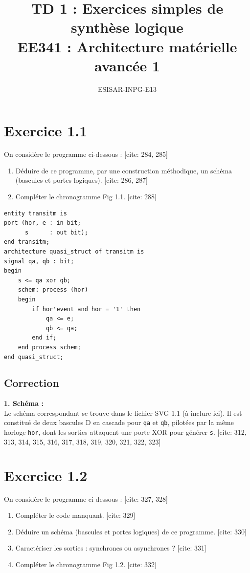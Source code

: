 \documentclass[11pt,a4paper]{article}
\title{TD 1 : Exercices simples de synthèse logique \\ \large EE341 : Architecture matérielle avancée 1}
\author{ESISAR-INPG-E13}
\date{}
\begin{document}
\maketitle

\section*{Exercice 1.1}
On considère le programme ci-dessous : [cite: 284, 285]
\begin{enumerate}
    \item Déduire de ce programme, par une construction méthodique, un schéma (bascules et portes logiques). [cite: 286, 287]
    \item Compléter le chronogramme Fig 1.1. [cite: 288]
\end{enumerate}

\begin{lstlisting}
entity transitm is
port (hor, e : in bit;
      s      : out bit);
end transitm;
architecture quasi_struct of transitm is
signal qa, qb : bit;
begin
    s <= qa xor qb;
    schem: process (hor)
    begin
        if hor'event and hor = '1' then
            qa <= e;
            qb <= qa;
        end if;
    end process schem;
end quasi_struct;
\end{lstlisting}

\subsection*{Correction}
\textbf{1. Schéma :}\\
Le schéma correspondant se trouve dans le fichier SVG 1.1 (à inclure ici). Il est constitué de deux bascules D en cascade pour \texttt{qa} et \texttt{qb}, pilotées par la même horloge \texttt{hor}, dont les sorties attaquent une porte XOR pour générer \texttt{s}. [cite: 312, 313, 314, 315, 316, 317, 318, 319, 320, 321, 322, 323]

\section*{Exercice 1.2}
On considère le programme ci-dessous : [cite: 327, 328]
\begin{enumerate}
    \item Compléter le code manquant. [cite: 329]
    \item Déduire un schéma (bascules et portes logiques) de ce programme. [cite: 330]
    \item Caractériser les sorties : synchrones ou asynchrones ? [cite: 331]
    \item Compléter le chronogramme Fig 1.2. [cite: 332]
\end{enumerate}
\end{document}
